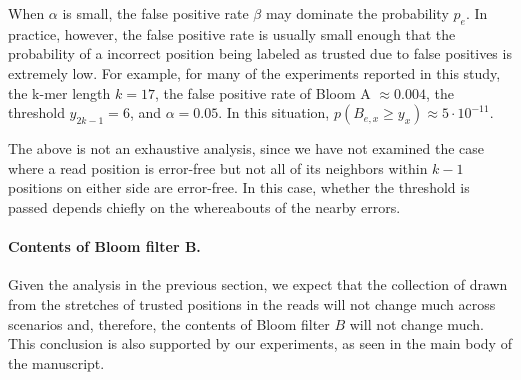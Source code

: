 \documentclass[10pt]{article}
\begin{document}
When $\alpha$ is small, the false positive rate $\beta$ may dominate the probability $p_e$.  In practice, however, the false positive rate is usually small enough that the probability of a incorrect position being labeled as trusted due to false positives is extremely low.  For example, for many of the experiments reported in this study, the k-mer length $k=17$, the false positive rate of Bloom A $\approx 0.004$, the threshold $y_{2k-1} = 6$, and $\alpha = 0.05$.  In this situation, $p(B_{e, x}\geq y_x) \approx 5 \cdot 10^{-11}.$

The above is not an exhaustive analysis, since we have not examined the case where a read position is error-free but not all of its neighbors within $k-1$ positions on either side are error-free.  In this case, whether the threshold is passed depends chiefly on the whereabouts of the nearby errors.

\paragraph{Contents of Bloom filter B.}
Given the analysis in the previous section, we expect that the collection of \kmers drawn from the stretches of trusted positions in the reads will not change much across scenarios and, therefore, the contents of Bloom filter $B$ will not change much.  This conclusion is also supported by our experiments, as seen in the main body of the manuscript.



\end{document}
